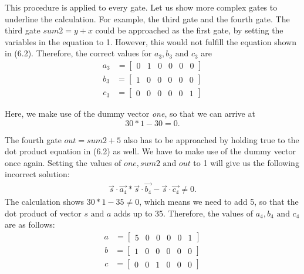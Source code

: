 This procedure is applied to every gate. Let us show more complex gates to underline the calculation. For example, the third gate and the fourth gate. The third gate \(sum2=y+x\) could be approached as the first gate, by setting the variables in the equation to 1. However, this would not fulfill the equation shown in (6.2). Therefore, the correct values for \(a_3, b_3 \text{ and }c_3\) are
\begin{align*}
    a_3 &=\begin{bmatrix}
        0 & 1 & 0 & 0 & 0 & 0
    \end{bmatrix}
\end{align*}
\begin{align*}
    b_3&=\begin{bmatrix}
        1 & 0 & 0 & 0 & 0 & 0 
    \end{bmatrix}
\end{align*}
\begin{align*}
    c_3&=\begin{bmatrix}
        0 & 0 & 0 & 0 & 0 & 1
    \end{bmatrix}
\end{align*}

Here, we make use of the dummy vector \textit{one}, so that we can arrive at 
\[30 * 1 - 30 = 0.\]

The fourth gate \(out=sum2+5\) also has to be approached by holding true to the dot product equation in (6.2) as well. We have to make use of the dummy vector once again. Setting the values of \(one, sum2 \text{ and } out\)  to 1 will give us the following incorrect solution:
\begin{align*}
     \Vec{s}\cdot\Vec{a_4} * \Vec{s}\cdot\Vec{b_4} - \Vec{s}\cdot\Vec{c_4} \neq 0.
\end{align*}
The calculation shows \(30 * 1 - 35 \neq 0\), which means we need to add 5, so that the dot product of vector \(s \text{ and } a\) adds up to 35. Therefore, the values of \(a_4, b_4 \text{ and }c_4\) are as follows:
\begin{align*}
    a &=\begin{bmatrix}
        5 & 0 & 0 & 0 & 0 & 1
    \end{bmatrix}
\end{align*}
\begin{align*}
    b&=\begin{bmatrix}
        1 & 0 & 0 & 0 & 0 & 0 
    \end{bmatrix}
\end{align*}
\begin{align*}
    c&=\begin{bmatrix}
        0 & 0 & 1 & 0 & 0 & 0
    \end{bmatrix}
\end{align*}


